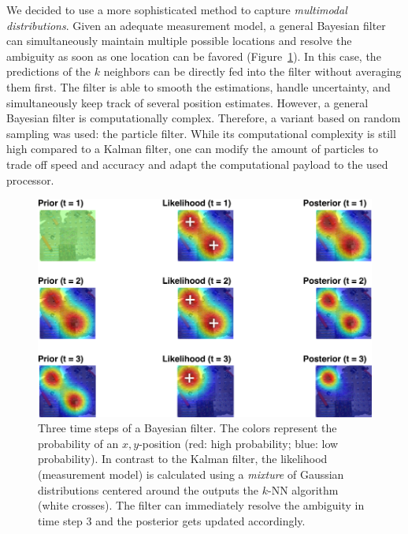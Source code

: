 \documentclass[11pt]{report}
\begin{document}

We decided to use a more sophisticated method to capture
\emph{multimodal distributions}. Given an adequate measurement model,
a general Bayesian filter can simultaneously maintain multiple
possible locations and resolve the ambiguity as soon as one location
can be favored (Figure~\ref{fig:bayes}). In this case, the predictions
of the $k$ neighbors can be directly fed into the filter without
averaging them first. The filter is able to smooth the estimations,
handle uncertainty, and simultaneously keep track of several position
estimates. However, a general Bayesian filter is computationally
complex. Therefore, a variant based on random sampling was used: the
particle filter. While its computational complexity is still high
compared to a Kalman filter, one can modify the amount of particles
to trade off speed and accuracy and adapt the computational payload to
the used processor.


\begin{figure}[h]
\begin{center}
  \includegraphics[width=0.8\columnwidth]{particle-crop}
  \caption[Bayesian Filter.]{{\label{fig:bayes} Three time steps of a
      Bayesian filter. The colors represent the probability of an
      $x,y$-position (red: high probability; blue: low
      probability). In contrast to the Kalman filter, the likelihood
      (measurement model) is calculated using a \emph{mixture} of
      Gaussian distributions centered around the outputs the $k$-NN
      algorithm (white crosses). The filter can immediately resolve
      the ambiguity in time step 3 and the posterior gets updated
      accordingly.}}
\end{center}
\end{figure}
\end{document}
